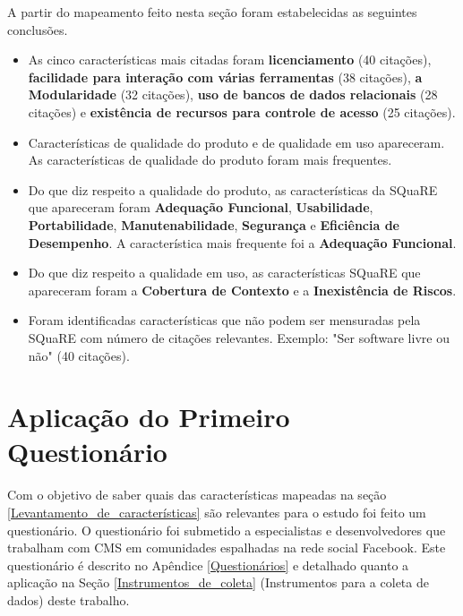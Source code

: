 A partir do mapeamento feito nesta seção foram estabelecidas as seguintes conclusões.

\begin{itemize}
\item As cinco características mais citadas foram  \textbf{licenciamento} (40 citações), \textbf{facilidade para interação com várias ferramentas} (38 citações), \textbf{a Modularidade} (32 citações), \textbf{uso de bancos de dados relacionais}  (28 citações) e \textbf{existência de recursos para controle de acesso} (25 citações). 

\item Características de qualidade do produto e de qualidade em uso apareceram. As características de qualidade do produto foram mais frequentes.

\item Do que diz respeito a qualidade do produto, as características da SQuaRE que apareceram foram \textbf{Adequação Funcional}, \textbf{Usabilidade}, \textbf{Portabilidade}, \textbf{Manutenabilidade}, \textbf{Segurança} e \textbf{Eficiência de Desempenho}. A característica mais frequente foi a \textbf{Adequação Funcional}.

\item Do que diz respeito a qualidade em uso, as características SQuaRE que apareceram foram a \textbf{Cobertura de Contexto} e a \textbf{Inexistência de Riscos}.

\item Foram identificadas características que não podem ser mensuradas pela SQuaRE com número de citações relevantes. Exemplo: "Ser software livre ou não" (40 citações).

\end{itemize}





\section{Aplicação do Primeiro Questionário}

Com o objetivo de saber quais das características mapeadas na seção \ref{Levantamento_de_características} são relevantes para o estudo foi feito um questionário. O questionário foi submetido a especialistas e desenvolvedores  que trabalham com CMS em comunidades espalhadas na rede social Facebook.  Este questionário é descrito no Apêndice \ref{Questionários} e detalhado quanto a aplicação na Seção \ref{Instrumentos_de_coleta} (Instrumentos para a coleta de dados) deste trabalho. 

